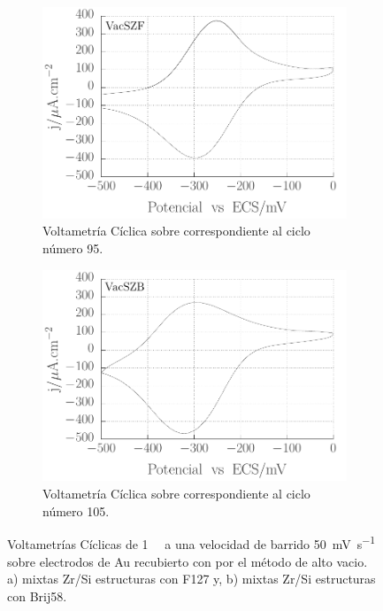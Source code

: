 		 	\begin{figure}[th]
		       \begin{subfigure}[t]{0.495\textwidth}
		       \includegraphics[width=\textwidth]{Graficos/SZF-accesibilidad.pdf}
		       \caption{Voltametría Cíclica sobre \pdmZ\space correspondiente al ciclo número 95.}
		       	\end{subfigure}
		       	\begin{subfigure}[t]{0.495\textwidth}
		       \includegraphics[width=\textwidth]{Graficos/SZB-accesibilidad.pdf}
		       \caption{Voltametría Cíclica sobre \pdmZB\space correspondiente al ciclo número 105.}
		   	\end{subfigure}
	     	\caption[Accesibilidad electrodo de trabajo sistemas mixtos Zr/Si.]{Voltametrías Cíclicas de \aminorutenio\space \SI{1}{\milli\Molar} a una velocidad de barrido \SI{50}{\milli\volt\per\second} sobre electrodos de Au recubierto con \pdm\space por el método de alto vacio. a) \pdm\space mixtas Zr/Si estructuras con F127 y, b)  mixtas Zr/Si estructuras con Brij58.}
			\label{fig:accesibilidadZr}
		     \end{figure}


